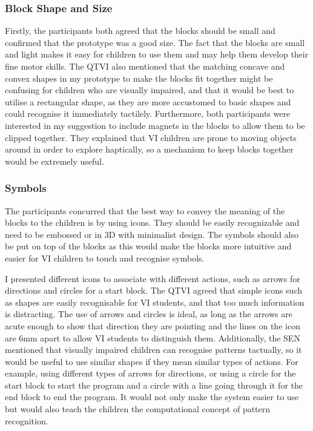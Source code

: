 \documentclass[oneside,%
                    author={Malak Hajji},
                    degree={BSc},
                    title={Designing An Accessible Ozobot Programming Platform for Students},
                  subtitle={With Mixed Visual Abilities}]{dissertation}
\begin{document}
\subsubsection{Block Shape and Size}
Firstly, the participants both agreed that the blocks should be small and confirmed that the prototype was a good size. The fact that the blocks are small and light makes it easy for  children to use them and may help them develop their fine motor skills. The QTVI also mentioned that the  matching concave and convex shapes in my prototype to make the blocks fit together might be confusing for children who are visually impaired, and that it would be best to utilise a rectangular shape, as they are more accustomed to basic shapes and could recognise it immediately tactilely. Furthermore, both participants were interested in my suggestion to include magnets in the blocks to allow them to be clipped together. They explained that VI children are prone to moving objects around in order to explore haptically, so a mechanism to keep blocks together would be extremely useful.

\subsubsection{Symbols}
The participants concurred that the best way to convey the meaning of the blocks to the children is by using icons. They should be easily recognizable and need to be embossed or in 3D with minimalist design. The symbols should also be put on top of the blocks as this would make the blocks more intuitive and easier for VI children to touch and recognise symbols.

I presented different icons to associate with different actions, such as arrows for directions and circles for a start block. The QTVI agreed that simple icons such as shapes are easily recognisable for VI students, and that too much information is distracting. The use of arrows and circles is ideal, as long as the arrows are acute enough to show that direction they are pointing and the lines on the icon are 6mm apart to allow VI students to distinguish them. Additionally, the SEN mentioned that visually impaired children can recognise patterns tactually, so it would be useful to use similar shapes if they mean similar types of actions. For example, using different types of arrows for directions, or using a circle for the start block to start the program and a circle with a line going through it for the end block to end the program. It would not only make the system easier to use but would also teach the children the computational concept of pattern recognition.
\end{document}
